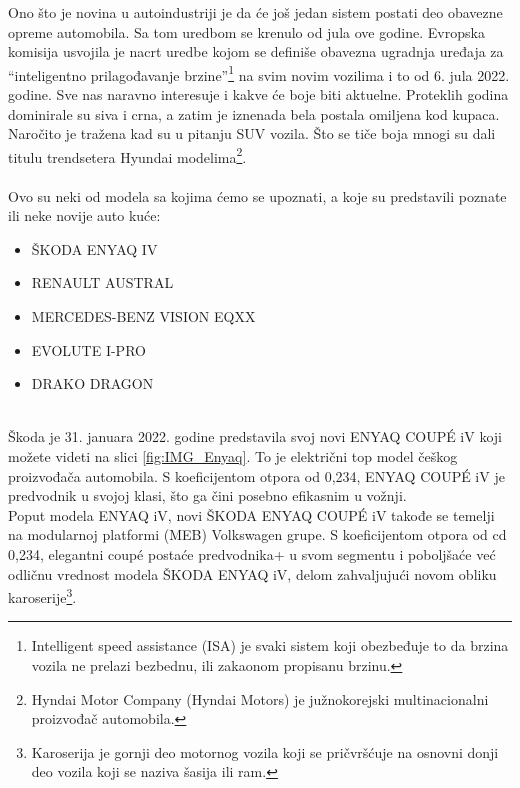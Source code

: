 \documentclass[a4paper]{article}
\begin{document}
    Ono što je novina u autoindustriji je da će još jedan sistem postati deo obavezne opreme automobila. Sa tom uredbom se krenulo od jula ove godine. Evropska komisija usvojila je nacrt uredbe kojom se definiše obavezna ugradnja uređaja za “inteligentno prilagođavanje brzine”\footnote{Intelligent speed assistance (ISA) je svaki sistem koji obezbeđuje to da brzina vozila ne prelazi bezbednu, ili zakaonom propisanu brzinu.} na svim novim vozilima i to od 6. jula 2022. godine. Sve nas naravno interesuje i kakve će boje biti aktuelne. Proteklih godina dominirale su siva i crna, a zatim je iznenada bela postala omiljena kod kupaca. Naročito je tražena kad su u pitanju SUV vozila. Što se tiče boja mnogi su dali titulu  trendsetera Hyundai modelima\footnote{Hyndai Motor Company (Hyndai Motors) je južnokorejski multinacionalni proizvođač automobila.}.
    \\\\
    Ovo su neki od modela sa kojima ćemo se upoznati, a koje su predstavili poznate ili neke novije auto kuće:\\
    \begin{itemize}
     \item ŠKODA ENYAQ IV 
     \item RENAULT AUSTRAL   
     \item MERCEDES-BENZ VISION EQXX 
     \item EVOLUTE I-PRO 
     \item DRAKO DRAGON\\ 
    \end{itemize}
    
\\

    Škoda je 31. januara 2022. godine predstavila svoj novi ENYAQ COUPÉ iV koji možete videti na slici \ref{fig:IMG_Enyaq}. To je električni top model češkog proizvođača automobila. S koeficijentom otpora od 0,234, ENYAQ COUPÉ iV je predvodnik u svojoj klasi, što ga čini posebno efikasnim u vožnji. \\
    Poput modela ENYAQ iV, novi ŠKODA ENYAQ COUPÉ iV takođe se temelji na modularnoj platformi (MEB) Volkswagen grupe. S koeficijentom otpora od cd 0,234, elegantni coupé postaće predvodnika+ u svom segmentu i poboljšaće već odličnu vrednost modela ŠKODA ENYAQ iV, delom zahvaljujući novom obliku karoserije\footnote{Karoserija je gornji deo motornog vozila koji se pričvršćuje na osnovni donji deo vozila koji se naziva šasija ili ram.}.\\ 
\end{document}
